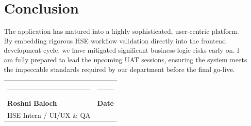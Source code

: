 \documentclass[12pt, a4paper]{article}
\begin{document}
\section{Conclusion}
The application has matured into a highly sophisticated, user-centric platform. By embedding rigorous HSE workflow validation directly into the frontend development cycle, we have mitigated significant business-logic risks early on. I am fully prepared to lead the upcoming UAT sessions, ensuring the system meets the impeccable standards required by our department before the final go-live.

\vspace{2cm}
\noindent\begin{tabularx}{\textwidth}{@{}X X@{}}
    \rule{6cm}{1pt} & \rule{6cm}{1pt} \\
    \textbf{Roshni Baloch} & \textbf{Date} \\
    HSE Intern / UI/UX \& QA & \\
\end{tabularx}
\end{document}
